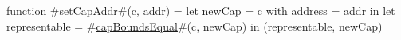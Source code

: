 function #\hyperref[sailRISCVzsetCapAddr]{setCapAddr}#(c, addr) =
    let newCap = { c with address = addr } in
    let representable = #\hyperref[sailRISCVzcapBoundsEqual]{capBoundsEqual}#(c, newCap) in
    (representable, newCap)
